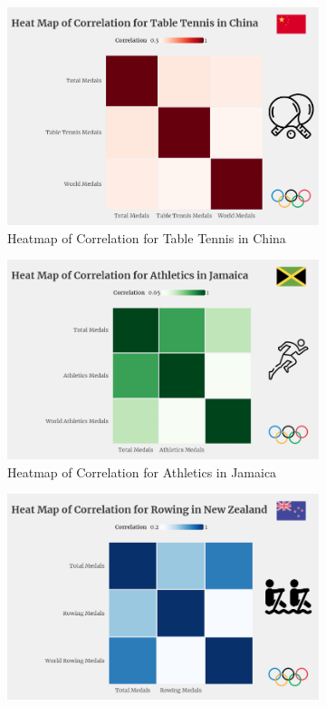 \documentclass[12pt]{article}  %
\begin{document}
\begin{figure}[htbp]
	\centering
	\begin{subfigure}[b]{.3\textwidth}
		\includegraphics[width=\textwidth]{img/Table Tennis.png}
		\caption{Heatmap of Correlation for Table Tennis in China}\label{subfig:1}
	\end{subfigure}
	\hfill 
	\begin{subfigure}[b]{.33\textwidth}
		\includegraphics[width=\textwidth]{img/Jamaica.png}
		\caption{ Heatmap of Correlation for Athletics in Jamaica}\label{subfig:2}
	\end{subfigure}
	\hfill 
	\begin{subfigure}[b]{.32\textwidth}
		\includegraphics[width=\textwidth]{img/New Zealand.png}

\end{subfigure}
\end{figure}
\end{document}
